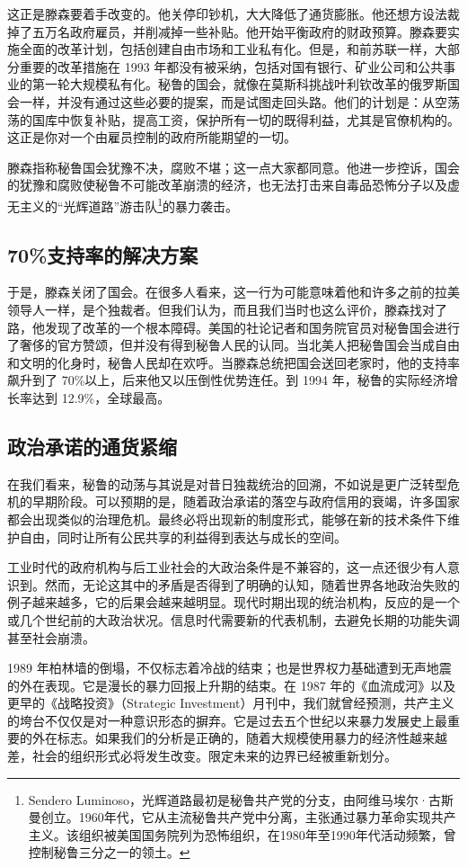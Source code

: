 这正是滕森要着手改变的。他关停印钞机，大大降低了通货膨胀。他还想方设法裁掉了五万名政府雇员，并削减掉一些补贴。他开始平衡政府的财政预算。滕森要实施全面的改革计划，包括创建自由市场和工业私有化。但是，和前苏联一样，大部分重要的改革措施在 1993 年都没有被采纳，包括对国有银行、矿业公司和公共事业的第一轮大规模私有化。秘鲁的国会，就像在莫斯科挑战叶利钦改革的俄罗斯国会一样，并没有通过这些必要的提案，而是试图走回头路。他们的计划是：从空荡荡的国库中恢复补贴，提高工资，保护所有一切的既得利益，尤其是官僚机构的。这正是你对一个由雇员控制的政府所能期望的一切。

滕森指称秘鲁国会犹豫不决，腐败不堪；这一点大家都同意。他进一步控诉，国会的犹豫和腐败使秘鲁不可能改革崩溃的经济，也无法打击来自毒品恐怖分子以及虚无主义的“光辉道路”游击队\footnote{Sendero Luminoso，光辉道路最初是秘鲁共产党的分支，由阿维马埃尔·古斯曼创立。1960年代，它从主流秘鲁共产党中分离，主张通过暴力革命实现共产主义。该组织被美国国务院列为恐怖组织，在1980年至1990年代活动频繁，曾控制秘鲁三分之一的领土。}的暴力袭击。

\subsection{70\%支持率的解决方案}
于是，滕森关闭了国会。在很多人看来，这一行为可能意味着他和许多之前的拉美领导人一样，是个独裁者。但我们认为，而且我们当时也这么评价，滕森找对了路，他发现了改革的一个根本障碍。美国的社论记者和国务院官员对秘鲁国会进行了奢侈的官方赞颂，但并没有得到秘鲁人民的认同。当北美人把秘鲁国会当成自由和文明的化身时，秘鲁人民却在欢呼。当滕森总统把国会送回老家时，他的支持率飙升到了 70\%以上，后来他又以压倒性优势连任。到 1994 年，秘鲁的实际经济增长率达到 12.9\%，全球最高。

\subsection{政治承诺的通货紧缩}
在我们看来，秘鲁的动荡与其说是对昔日独裁统治的回溯，不如说是更广泛转型危机的早期阶段。可以预期的是，随着政治承诺的落空与政府信用的衰竭，许多国家都会出现类似的治理危机。最终必将出现新的制度形式，能够在新的技术条件下维护自由，同时让所有公民共享的利益得到表达与成长的空间。

工业时代的政府机构与后工业社会的大政治条件是不兼容的，这一点还很少有人意识到。然而，无论这其中的矛盾是否得到了明确的认知，随着世界各地政治失败的例子越来越多，它的后果会越来越明显。现代时期出现的统治机构，反应的是一个或几个世纪前的大政治状况。信息时代需要新的代表机制，去避免长期的功能失调甚至社会崩溃。

1989 年柏林墙的倒塌，不仅标志着冷战的结束；也是世界权力基础遭到无声地震的外在表现。它是漫长的暴力回报上升期的结束。在 1987 年的《血流成河》以及更早的《战略投资》（Strategic Investment）月刊中，我们就曾经预测，共产主义的垮台不仅仅是对一种意识形态的摒弃。它是过去五个世纪以来暴力发展史上最重要的外在标志。如果我们的分析是正确的，随着大规模使用暴力的经济性越来越差，社会的组织形式必将发生改变。限定未来的边界已经被重新划分。